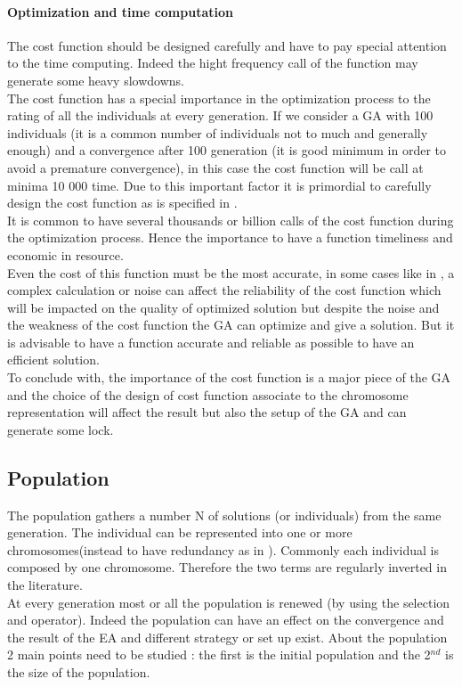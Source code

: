 \paragraph*{Optimization and time computation}
The cost function should be designed carefully and have to pay special attention to the time computing. Indeed the hight frequency call of the function may generate some heavy slowdowns. \\
The cost function has a special importance in the optimization process to  the rating of all the individuals at every generation. If we consider a GA with 100 individuals (it is a common number of individuals  not to much and  generally enough) and a convergence after 100 generation (it is good minimum in order to avoid a premature convergence), in this case the cost function will be call at minima 10 000 time. Due  to this important factor it is primordial to carefully design the cost function as is specified in \cite{70*arabas1994}.\\
It is common to have several thousands or billion calls of the cost function during the optimization process.
  Hence the importance to have a function timeliness and economic in resource. \\
Even the cost of this function must be the most accurate, in some cases like in \cite{95*miller1995}, a complex calculation or noise can affect the reliability of the cost function which will be impacted on the quality of optimized solution but despite the noise and the weakness of the cost function the GA can optimize and give a solution. But it is advisable to have a function accurate and reliable as possible to have an efficient solution.\\
 To conclude with, the importance of the cost function is a major piece of the GA and the choice of the design of cost function associate to the chromosome representation will affect the result but also the setup of the GA and can generate some lock. \\

	
\subsection{Population }\label{sec:Population}
The population gathers a number N of solutions (or individuals) from the same generation. The individual can be represented into one or  more chromosomes(instead to have redundancy as in \cite{ 121*ronald1997}). Commonly each individual is composed by one chromosome. Therefore the two terms are regularly inverted in the literature.\\
At every generation most or all the population is renewed (by using the selection and operator). Indeed the population can have an effect on the convergence and the result of the EA and different strategy or set up exist. About the population 2 main points need to be studied : the first is the initial population and the 2$^{nd}$ is the size of the population.  

